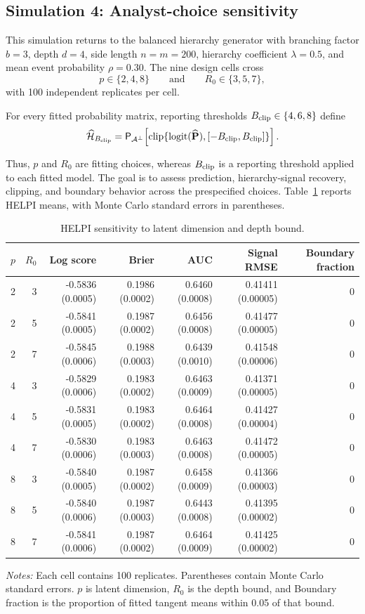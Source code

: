 \documentclass[
  12pt]{article}
\newcommand{\TableNote}[1]{%
  \par\vspace{0.35em}\noindent
  \begin{minipage}{0.96\linewidth}
    \footnotesize\setstretch{1.05}\raggedright
    \textit{Notes:} #1
  \end{minipage}%
  \par\vspace{0.6\baselineskip}%
}
\theoremstyle{definition}
\theoremstyle{plain}
\newcommand{\calA}{\mathcal A}
\newcommand{\projA}{\mathsf P_{\calA^\perp}}
\newcommand{\bP}{\mathbf P}
\DeclareMathOperator{\clip}{clip}
\DeclareMathOperator{\logit}{logit}
\begin{document}
\subsection{Simulation 4: Analyst-choice sensitivity}
\label{supp:sensitivity-results}

This simulation returns to the balanced hierarchy generator with branching factor $b=3$, depth $d=4$, side length $n=m=200$, hierarchy coefficient $\lambda=0.5$, and mean event probability $\rho=0.30$. The nine design cells cross
\[
p\in\{2,4,8\}
\qquad\text{and}\qquad
R_0\in\{3,5,7\},
\]
with 100 independent replicates per cell.
\begin{samepage}
	For every fitted probability matrix, reporting thresholds $B_{\rm clip}\in\{4,6,8\}$ define
	\[
	\widehat{\mathcal H}_{B_{\rm clip}}
	=\projA\!\left[
	\clip\{\logit(\widehat{\bP}),[-B_{\rm clip},B_{\rm clip}]\}
	\right].
	\]
\end{samepage}
Thus, $p$ and $R_0$ are fitting choices, whereas $B_{\rm clip}$ is a reporting threshold applied to each fitted model. The goal is to assess prediction, hierarchy-signal recovery, clipping, and boundary behavior across the prespecified choices. Table~\ref{tab:sensitivity} reports HELPI means, with Monte Carlo standard errors in parentheses.

\begin{table}[H]
	\centering
	\scriptsize
	\caption{HELPI sensitivity to latent dimension and depth bound.}
	\label{tab:sensitivity}
	\begin{tabular}{rrrrrrr}
		\toprule
		$p$ & $R_0$ & Log score & Brier & AUC & Signal RMSE & Boundary fraction \\
		\midrule
		2 & 3 & -0.5836 (0.0005) & 0.1986 (0.0002) & 0.6460 (0.0008) & 0.41411 (0.00005) & 0 \\
		2 & 5 & -0.5841 (0.0005) & 0.1987 (0.0002) & 0.6456 (0.0008) & 0.41477 (0.00005) & 0 \\
		2 & 7 & -0.5845 (0.0006) & 0.1988 (0.0003) & 0.6439 (0.0010) & 0.41548 (0.00006) & 0 \\
		4 & 3 & -0.5829 (0.0006) & 0.1983 (0.0002) & 0.6463 (0.0009) & 0.41371 (0.00005) & 0 \\
		4 & 5 & -0.5831 (0.0005) & 0.1983 (0.0002) & 0.6464 (0.0008) & 0.41427 (0.00004) & 0 \\
		4 & 7 & -0.5830 (0.0006) & 0.1983 (0.0003) & 0.6463 (0.0008) & 0.41472 (0.00005) & 0 \\
		8 & 3 & -0.5840 (0.0005) & 0.1987 (0.0002) & 0.6458 (0.0009) & 0.41366 (0.00003) & 0 \\
		8 & 5 & -0.5840 (0.0006) & 0.1987 (0.0003) & 0.6443 (0.0008) & 0.41395 (0.00002) & 0 \\
		8 & 7 & -0.5841 (0.0006) & 0.1987 (0.0002) & 0.6464 (0.0009) & 0.41425 (0.00002) & 0 \\
		\bottomrule
	\end{tabular}
	\TableNote{Each cell contains 100 replicates. Parentheses contain Monte Carlo standard errors. $p$ is latent dimension, $R_0$ is the depth bound, and Boundary fraction is the proportion of fitted tangent means within 0.05 of that bound.}
\end{table}
\end{document}
